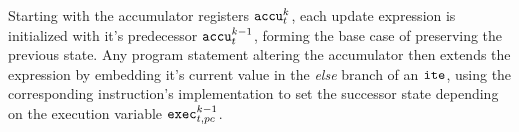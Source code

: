 Starting with the accumulator registers $\texttt{accu}^k_t$, each update expression is initialized with it's predecessor $\texttt{accu}^{k - 1}_t$, forming the base case of preserving the previous state.
Any program statement altering the accumulator then extends the expression by embedding it's current value in the \emph{else} branch of an $\texttt{ite}$, using the corresponding instruction's  implementation to set the successor state
depending on the
execution variable $\texttt{exec}^{k - 1}_{t, pc}$.

